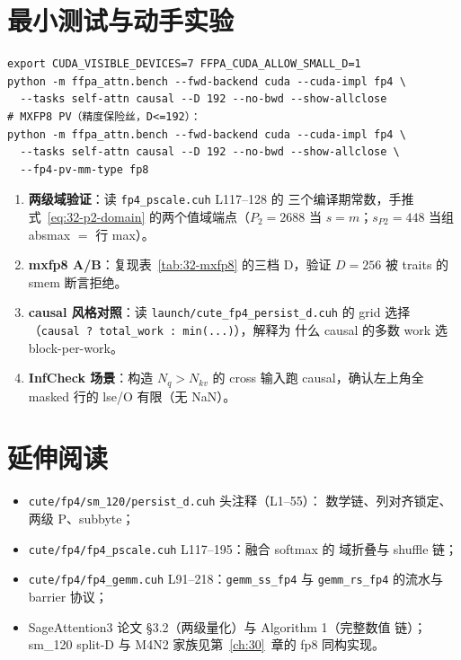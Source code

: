 \section{最小测试与动手实验}

\begin{lstlisting}[style=console]
export CUDA_VISIBLE_DEVICES=7 FFPA_CUDA_ALLOW_SMALL_D=1
python -m ffpa_attn.bench --fwd-backend cuda --cuda-impl fp4 \
  --tasks self-attn causal --D 192 --no-bwd --show-allclose
# MXFP8 PV（精度保险丝，D<=192）：
python -m ffpa_attn.bench --fwd-backend cuda --cuda-impl fp4 \
  --tasks self-attn causal --D 192 --no-bwd --show-allclose \
  --fp4-pv-mm-type fp8
\end{lstlisting}

\begin{enumerate}[itemsep=2pt,topsep=2pt]
  \item \textbf{两级域验证}：读 \texttt{fp4\_pscale.cuh} L117--128 的
        三个编译期常数，手推
        式~\ref{eq:32-p2-domain} 的两个值域端点（$P_2=2688$ 当
        $s=m$；$s_{P2}=448$ 当组 absmax $=$ 行 max）。
  \item \textbf{mxfp8 A/B}：复现表~\ref{tab:32-mxfp8} 的三档 D，验证
        $D{=}256$ 被 traits 的 smem 断言拒绝。
  \item \textbf{causal 风格对照}：读 \texttt{launch/cute\_fp4\_persist\_d.cuh} 的
        grid 选择（\texttt{causal ? total\_work : min(...)}），解释为
        什么 causal 的多数 work 选 block-per-work。
  \item \textbf{InfCheck 场景}：构造 $N_q>N_{kv}$ 的 cross 输入跑
        causal，确认左上角全 masked 行的 lse/O 有限（无 NaN）。
\end{enumerate}

\section*{延伸阅读}

\begin{itemize}[itemsep=0pt,topsep=2pt]
  \item \texttt{cute/fp4/sm\_120/persist\_d.cuh} 头注释（L1--55）：
        数学链、列对齐锁定、两级 P、subbyte；
  \item \texttt{cute/fp4/fp4\_pscale.cuh} L117--195：融合 softmax 的
        域折叠与 shuffle 链；
  \item \texttt{cute/fp4/fp4\_gemm.cuh} L91--218：\texttt{gemm\_ss\_fp4}
        与 \texttt{gemm\_rs\_fp4} 的流水与 barrier 协议；
  \item SageAttention3 论文 §3.2（两级量化）与 Algorithm 1（完整数值
        链）；sm\_120 split-D 与 M4N2 家族见第~\ref{ch:30}~章的 fp8
        同构实现。
\end{itemize}
